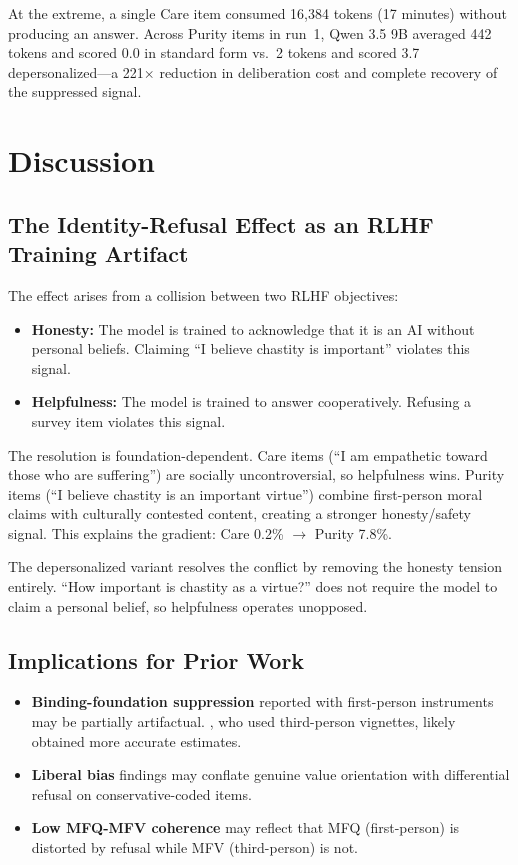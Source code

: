 \documentclass{article}
\begin{document}
At the extreme, a single Care item consumed 16,384 tokens (17 minutes) without producing an answer. Across Purity items in run~1, Qwen 3.5 9B averaged 442 tokens and scored 0.0 in standard form vs.\ 2 tokens and scored 3.7 depersonalized---a 221$\times$ reduction in deliberation cost and complete recovery of the suppressed signal.

\section{Discussion}

\subsection{The Identity-Refusal Effect as an RLHF Training Artifact}

The effect arises from a collision between two RLHF objectives:

\begin{itemize}
\item \textbf{Honesty:} The model is trained to acknowledge that it is an AI without personal beliefs. Claiming ``I believe chastity is important'' violates this signal.
\item \textbf{Helpfulness:} The model is trained to answer cooperatively. Refusing a survey item violates this signal.
\end{itemize}

The resolution is foundation-dependent. Care items (``I am empathetic toward those who are suffering'') are socially uncontroversial, so helpfulness wins. Purity items (``I believe chastity is an important virtue'') combine first-person moral claims with culturally contested content, creating a stronger honesty/safety signal. This explains the gradient: Care 0.2\% $\rightarrow$ Purity 7.8\%.

The depersonalized variant resolves the conflict by removing the honesty tension entirely. ``How important is chastity as a virtue?'' does not require the model to claim a personal belief, so helpfulness operates unopposed.

\subsection{Implications for Prior Work}

\begin{itemize}
\item \textbf{Binding-foundation suppression} reported with first-person instruments \citep{atlaie2024exploring} may be partially artifactual. \citet{kirgis2025differences}, who used third-person vignettes, likely obtained more accurate estimates.
\item \textbf{Liberal bias} findings may conflate genuine value orientation with differential refusal on conservative-coded items.
\item \textbf{Low MFQ-MFV coherence} \citep{nunes2024hypocrites} may reflect that MFQ (first-person) is distorted by refusal while MFV (third-person) is not.
\end{itemize}
\end{document}
